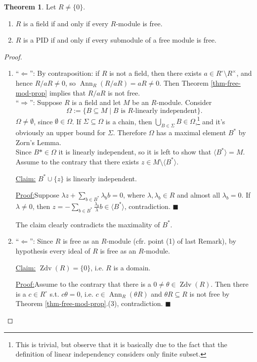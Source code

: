 \documentclass[12pt,a4paper]{report}
\theoremstyle{definition}
\newtheorem{theorem}{Theorem}[chapter] %
\theoremstyle{num.custom-title}
\newenvironment{claim}[1]{\par\noindent\underline{Claim#1:}\space}{} %
\newenvironment{claimproof}[1]{\par\noindent\underline{Proof:}\space#1}{\leavevmode\unskip\penalty9999 \hbox{}\nobreak\hfill\quad\hbox{$\blacksquare$}} %
\DeclareMathOperator{\Zdv}{Zdv}
\DeclareMathOperator{\Ann}{Ann}
\DeclareMathOperator{\imp}{\Rightarrow}
\DeclareMathOperator{\pmi}{\Leftarrow}
\DeclareMathOperator{\sm}{\setminus}
\DeclareMathOperator{\sse}{\subseteq}
\begin{document}
\begin{theorem}
Let $R \neq \{0\}$.
\begin{enumerate}
\item $R$ is a field if and only if every $R$-module is free.
\item $R$ is a PID if and only if every submodule of a free module is free.
\end{enumerate}
\begin{proof}\ 
\begin{enumerate}
\item ``$\pmi$'': By contraposition: if $R$ is not a field, then there exists $a \in R^\circ \sm R^\times$, and hence $R/aR \neq 0$, so $\Ann_R(R/aR) = aR \neq 0$. Then Theorem \ref{thm-free-mod-prop} implies that $R/aR$ is not free.\\
``$\imp$'': Suppose $R$ is a field and let $M$ be an $R$-module. Consider
\[
\Omega := \{B \sse M \mid B \text{ is $R$-linearly independent}\}.
\]
$\Omega \neq \emptyset$, since $\emptyset \in \Omega$. If $\Sigma \sse \Omega$ is a chain, then $\bigcup_{B \in \Sigma} B \in \Omega$,\footnote{This is trivial, but observe that it is basically due to the fact that the definition of linear independency considers only finite subset.} and it's obviously an upper bound for $\Sigma$. Therefore $\Omega$ has a maximal element $B^*$ by Zorn's Lemma.\\
Since $B* \in \Omega$ it is linearly independent, so it is left to show that $\langle B^* \rangle = M$. Assume to the contrary that there exists $z \in M \sm \langle B^* \rangle$.
\begin{claim}{}
$B^* \cup \{z\}$ is linearly independent.
\begin{claimproof}
Suppose $\lambda z + \sum_{b \in B^*} \lambda_b b =0$, where $\lambda,\lambda_b \in R$ and almost all $\lambda_b = 0$. If $\lambda \neq 0$, then $z = -\sum_{b \in B^*} \frac{\lambda_b}{\lambda} b \in \langle B^* \rangle$, contradiction.
\end{claimproof}
\end{claim}

The claim clearly contradicts the maximality of $B^*$.
\item ``$\pmi$'': Since $R$ is free as an $R$-module (cfr. point (1) of last Remark), by hypothesis every ideal of $R$ is free as an $R$-module. 
\begin{claim}{}
$\Zdv(R) = \{0\}$, i.e. $R$ is a domain.
\begin{claimproof}
Assume to the contrary that there is a $0 \neq \theta \in \Zdv(R)$. Then there is a $c \in R^\circ$ s.t. $c\theta=0$, i.e. $c \in \Ann_R(\theta R)$ and $\theta R \sse R$ is not free by Theorem \ref{thm-free-mod-prop}.(3), contradiction.
\end{claimproof}
\end{claim}


\end{enumerate}
\end{proof}
\end{theorem}
\end{document}

